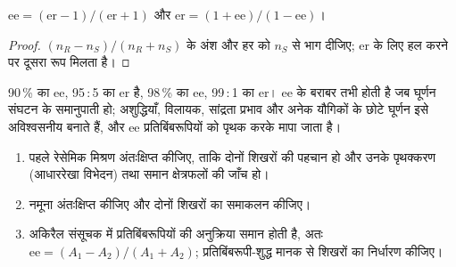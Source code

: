 \begin{proposition}[ee और er]\label{prop:b3:asymmetric-synthesis:ee-er}
$\mathrm{ee} = (\mathrm{er} - 1)/(\mathrm{er} + 1)$ और $\mathrm{er} = (1 + \mathrm{ee})/(1 - \mathrm{ee})$।
\end{proposition}

\begin{proof}
$(n_R - n_S)/(n_R + n_S)$ के अंश और हर को $n_S$ से भाग दीजिए; er के लिए हल करने पर
दूसरा रूप मिलता है।
\end{proof}

90\,\% का ee, 95\,:\,5 का er है, 98\,\% का ee, 99\,:\,1 का er। 
ee के बराबर तभी होती है जब घूर्णन संघटन के समानुपाती हो; अशुद्धियाँ,
विलायक, सांद्रता प्रभाव और अनेक यौगिकों के छोटे घूर्णन इसे
अविश्वसनीय बनाते हैं, और ee प्रतिबिंबरूपियों को पृथक करके मापा जाता है।

\begin{method}[किरैल क्रोमैटोग्राम से ee]\label{met:b3:asymmetric-synthesis:ee-chromatogram}
\begin{enumerate}
  \item पहले रेसेमिक मिश्रण अंतःक्षिप्त कीजिए, ताकि दोनों शिखरों की पहचान हो और उनके
        पृथक्करण (आधाररेखा विभेदन) तथा समान क्षेत्रफलों की जाँच हो।
  \item नमूना अंतःक्षिप्त कीजिए और दोनों शिखरों का समाकलन कीजिए।
  \item अकिरैल संसूचक में प्रतिबिंबरूपियों की अनुक्रिया समान होती है, अतः
        $\mathrm{ee} = (A_1 - A_2)/(A_1 + A_2)$; प्रतिबिंबरूपी-शुद्ध मानक से शिखरों का निर्धारण कीजिए।
\end{enumerate}
\end{method}

